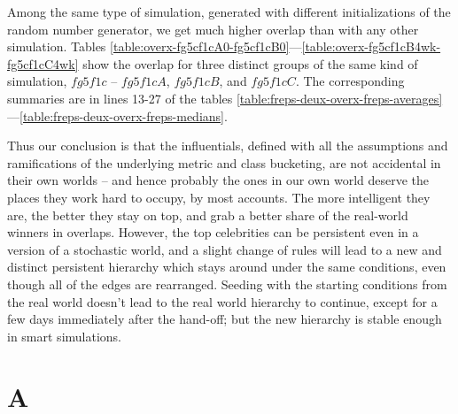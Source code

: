 \documentclass[10pt,oneside]{memoir}
\def\mybibliostyle{plain}
\def\bibliocommand{}
\begin{document}
Among the same type of simulation, generated with different initializations of the random number generator, we get much higher overlap than with any other simulation.  Tables \ref{table:overx-fg5cf1cA0-fg5cf1cB0}---\ref{table:overx-fg5cf1cB4wk-fg5cf1cC4wk} show the overlap for three distinct groups of the same kind of simulation, $fg5f1c$ -- $fg5f1cA$, $fg5f1cB$, and $fg5f1cC$.  The corresponding summaries are in lines 13-27 of the tables \ref{table:freps-deux-overx-freps-averages}---\ref{table:freps-deux-overx-freps-medians}.


Thus our conclusion is that the influentials, defined with all the assumptions and ramifications of the underlying metric and class bucketing, are not accidental in their own worlds -- and hence probably the ones in our own world deserve the places they work hard to occupy, by most accounts.  The more intelligent they are, the better they stay on top, and grab a better share of the real-world winners in overlaps.  However, the top celebrities can be persistent even in a version of a stochastic world, and a slight change of rules will lead to a new and distinct persistent hierarchy which stays around under the same conditions, even though all of the edges are rearranged.  Seeding with the starting conditions from the real world doesn't lead to the real world hierarchy to continue, except for a few days immediately after the hand-off; but the new hierarchy is stable enough in smart simulations.





\appendixpage
\appendix
\chapter{A}
\pagestyle{plain}


%
%

\backmatter


\bibliocommand

\printglossary


\printindex
\end{document}
